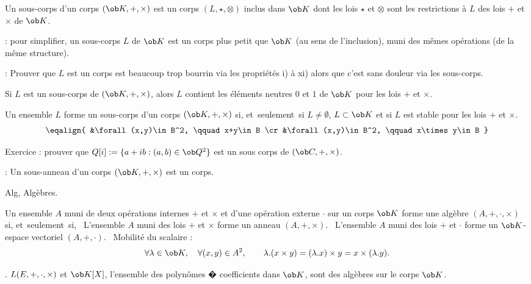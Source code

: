 \Definition []  Un sous-corps d'un corps $(\ob K,+,\times)$ est un corps $(L, \star, \otimes)$ inclus dans $\ob K$ 
dont les lois $\star$ et $\otimes$ sont les restrictions à $L$ des lois $+$ et $\times$ de $\ob K$. 
\bigskip

\Remarque : pour simplifier, un sous-corps $L$ de $\ob K$ est un corps plus petit que $\ob K$ (au sens de l'inclusion), 
muni des mêmes opérations (de la même structure). 
\bigskip

\Remarque : Prouver que $L$ est un corps est beaucoup trop bourrin via les propriétés i) à xi) alors que 
c'est sans douleur via les sous-corps. 
\bigskip

\Propriete []  Si $L$ est un sous-corps de $(\ob K,+,\times)$, alors $L$ contient les éléments neutres $0$ et $1$ de $\ob K$ 
pour les lois $+$ et $\times$. 
\bigskip

\Propriete []  Un ensemble $L$ forme un sous-corps d'un corps $(\ob K,+,\times)$ si, et~seulement~si
$L\neq\emptyset$, $L\subset \ob K$ et si $L$ est stable pour les lois $+$ et $\times$. 
$$
\eqalign{
	&\forall (x,y)\in B^2, \qquad x+y\in B
	\cr
	&\forall (x,y)\in B^2, \qquad x\times y\in B
}
$$

 
Exercice :  prouver que $Q[i]:=\{a+ib:(a,b)\in\ob Q^2\}$ est un sous corps de $(\ob C,+,\times)$. 
\bigskip

\Remarque : Un sous-anneau d'un corps $(\ob K, +,\times)$ est un corps. 
\bigskip

\Section Alg, Algèbres.
\bigskip

       
\Definition [] Un ensemble $A$ muni de deux opérations internes $+$ et $\times$ et d'une opération externe $\cdot$ 
sur un corps $\ob K$ forme une algèbre $(A,+,\cdot,\times)$ si, et~seulement~si, 
\medskip
\noindent\qquad{}\ L'ensemble $A$ muni des lois $+$ et $\times$ forme un anneau $(A,+,\times)$.
\medskip
\noindent\qquad{}\ L'ensemble $A$ muni des lois $+$ et $\cdot$ forme un $\ob K$-espace vectoriel $(A,+,\cdot)$. 
\medskip
\noindent\qquad{}\ Mobilité du scalaire : 
$$
\forall \lambda\in\ob K, \quad\forall (x,y)\in A^2,\qquad \lambda.(x\times y)=(\lambda.x)\times y=x\times(\lambda.y).
$$


\Exemple. $\sc L(E,+,\cdot,\times)$ et $\ob K[X]$, l'ensemble des polynômes � coefficients dans $\ob K$, 
sont des algèbres sur le corps $\ob K$. 
\bigskip

                
         




